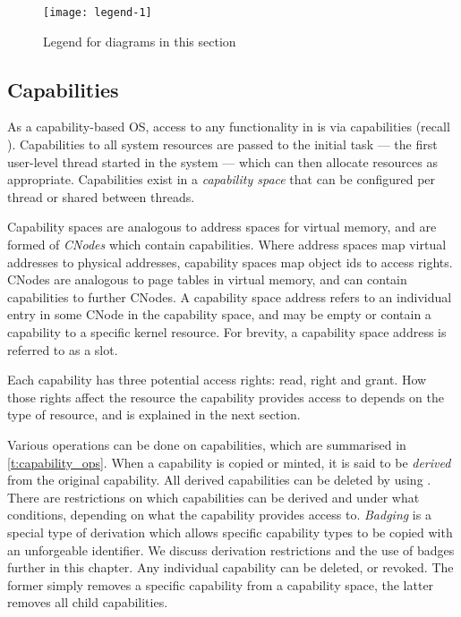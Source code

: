 \begin{figure}
    \centering
    \texttt{[image: legend-1]}
    \caption{Legend for diagrams in this section}
    \label{f:legend-1}
\end{figure}

\subsection{Capabilities}
\label{s:capabilities}

As a capability-based \gls{OS}, access to any functionality in \selfour is via capabilities (recall
). Capabilities to all system resources are passed to the initial task --- the first
user-level thread started in the system --- which can then allocate resources as appropriate.
Capabilities exist in a \emph{capability space} that can be configured per thread or shared between
threads. 

Capability spaces are analogous to address spaces for virtual memory, and are formed of
\emph{CNodes} which contain capabilities. Where address spaces map virtual addresses to physical
addresses, capability spaces map object ids to access rights.  CNodes are analogous to page tables
in virtual memory, and can contain capabilities to further CNodes. A capability space address refers
to an individual entry in some CNode in the capability space, and may be empty or contain a
capability to a specific kernel resource. For brevity, a capability space address is referred to as
a slot. 

Each capability has three potential access rights: read, right and grant. How those rights affect
the resource the capability provides access to depends on the type of resource, and is explained in
the next section.

Various operations can be done on capabilities, which are summarised in \cref{t:capability_ops}.
When a capability is copied or minted, it is said to be \emph{derived} from the original capability.
All derived capabilities can be deleted by using .
There are restrictions on which capabilities can be derived and under what conditions, depending on
what the capability provides access to. 
\emph{Badging} is a special type of derivation which allows specific capability types to be copied
with an unforgeable identifier. We discuss derivation restrictions and the use of badges further
in this chapter.
Any individual capability can be deleted, or revoked. The former simply removes a specific
capability from a capability space, the latter removes all child capabilities.

